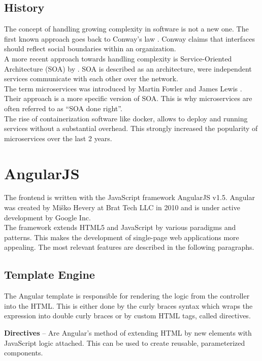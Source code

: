 \subsection{History}
The concept of handling growing complexity in software is not a new one. The first known approach goes back to Conway's law \cite{conway1968committees}. Conway claims that interfaces should reflect social boundaries within an organization.\\
A more recent approach towards handling complexity is Service-Oriented Architecture (SOA) by \cite{as2005service}. SOA is described as an architecture, were independent services communicate with each other over the network.\\
The term microservices was introduced by Martin Fowler and James Lewis \cite{martinfowler2014microservices}. Their approach is a more specific version of SOA. This is why microservices are often referred to as \enquote{SOA done right}.\\
The rise of containerization software like docker, allows to deploy and running services without a substantial overhead. This strongly increased the popularity of microservices over the last 2 years.



\section{AngularJS}
\label{sec:angularjs}
The frontend is written with the JavaScript framework AngularJS v1.5. Angular was created by Miško Hevery at Brat Tech LLC in 2010 and is under active development by Google Inc. \\
The framework extends HTML5 and JavaScript by various paradigms and patterns. This makes the development of single-page web applications more appealing. The most relevant features are described in the following paragraphs.


\subsection{Template Engine}
The Angular template is responsible for rendering the logic from the controller into the HTML. This is either done by the curly braces syntax which wraps the expression into double curly braces or by custom HTML tags, called directives.\vspace{1ex}

\noindent\textbf{Directives} -- Are Angular's method of extending HTML by new elements with JavaScript logic attached. This can be used to create reusable, parameterized components.

